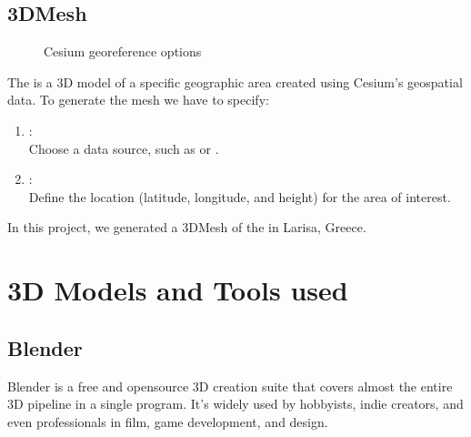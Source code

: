 \documentclass[letterpaper,10pt,english]{jupyterBook}
\begin{document}
\section{3D\sphinxhyphen{}Mesh}
\label{\detokenize{Cesium:d-mesh}}
\begin{figure}[htbp]
\centering
\capstart

\noindent{}
\caption{Cesium georeference options}\label{\detokenize{Cesium:cesium-3d-generated-mesh}}\end{figure}

\sphinxAtStartPar
The  is a 3D model of a specific geographic area created using Cesium’s geospatial data. To generate the mesh we have to specify:
\begin{enumerate}
%
\item {} 
\sphinxAtStartPar
{}:\\
Choose a data source, such as  or .

\item {} 
\sphinxAtStartPar
{}:\\
Define the location (latitude, longitude, and height) for the area of interest.

\end{enumerate}

\sphinxAtStartPar
In this project, we generated a 3D\sphinxhyphen{}Mesh of the  in Larisa, Greece.

\sphinxstepscope


\chapter{3D Models and Tools used}
\label{\detokenize{Blender:d-models-and-tools-used}}\label{\detokenize{Blender::doc}}

\section{Blender}
\label{\detokenize{Blender:blender}}
\sphinxAtStartPar
Blender is a free and open\sphinxhyphen{}source 3D creation suite that covers almost the entire 3D pipeline in a single program. It’s widely used by hobbyists, indie creators, and even professionals in film, game development, and design.
\end{document}
